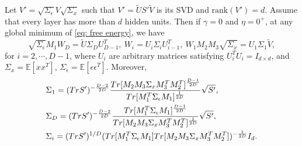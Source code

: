 \documentclass[10pt,a4paper]{amsart}
\newcommand{\Tr}{{\rm Tr}}
\begin{document}
\begin{theorem}
\label{theo:deep_linear}
Let $V'=\sqrt{\Sigma_\epsilon}V\sqrt{\Sigma_x}$ such that $V'=\tilde{U}S'\tilde{V}$ is its SVD and $\text{rank}(V')=d$. Assume that every layer has more than $d$ hidden units. Then if $\gamma=0$ and $\eta=0^+$, at any global minimum of \eqref{eq: free energy}, we have
\begin{equation}
\sqrt{\Sigma_\epsilon}M_1W_{D}=\tilde{U}\Sigma_DU_{D-1}^T,\ W_i=U_i\Sigma_iU_{i-1}^T,\ W_1M_2M_3\sqrt{\Sigma_x}=U_1\Sigma_1\tilde{V},
\end{equation}
for $i=2,\cdots,D-1$, where $U_i$ are arbitrary matrices satisfying $U_i^TU_i=I_{d\times d}$, and $\Sigma_x=\mathbb{E}[xx^T]$, $\Sigma_\epsilon=\mathbb{E}[\epsilon\epsilon^T]$. Moreover,
\begin{equation}
\begin{aligned}
&\Sigma_1=(\Tr S')^{-\frac{D-2}{2D}}\frac{\Tr[M_2M_3\Sigma_xM_3^TM_2^T]^{\frac{D-1}{2D}}}{\Tr[M_1^T\Sigma_\epsilon M_1]^{\frac{1}{2D}}}\sqrt{S'},\\
&\Sigma_D=(\Tr S')^{-\frac{D-2}{2D}}\frac{\Tr[M_1^T\Sigma_\epsilon M_1]^{\frac{D-1}{2D}}}{\Tr[M_2M_3\Sigma_xM_3^TM_2^T]^{\frac{1}{2D}}}\sqrt{S'},\\
&\Sigma_i=(\Tr S')^{1/D}(\Tr[M_1^T\Sigma_\epsilon M_1]\Tr[M_2M_3\Sigma_xM_3^TM_2^T])^{-\frac{1}{2D}}I_d.
\end{aligned}
\end{equation}
\end{theorem}
\end{document}
